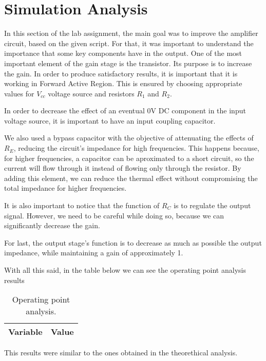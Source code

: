 \section{Simulation Analysis}
\label{sec:simulation}

In this section of the lab assignment, the main goal was to improve the amplifier circuit, based on the given script. For that, it was important to understand the importance that some key components have in the output. One of the most important element of the gain stage is the transistor. Its purpose is to increase the gain. In order to produce satisfactory results, it is important that it is working in Forward Active Region. This is ensured by choosing appropriate values for $V_{cc}$ voltage source and resistors $R_1$ and $R_2$.
\par
In order to decrease the effect of an eventual 0V DC component in the input voltage source, it is important to have an input coupling capacitor.
\par
We also used a bypass capacitor with the objective of attenuating the effects of $R_E$, reducing the circuit's impedance for high frequencies. This happens because, for higher frequencies, a capacitor can be aproximated to a short circuit, so the current will flow through it instead of flowing only through the resistor. By adding this element, we can reduce the thermal effect without compromising the total impedance for higher frequencies.
\par
It is also important to notice that the function of $R_C$ is to regulate the output signal. However, we need to be careful while doing so, because we can significantly decrease the gain.
\par
For last, the output stage's function is to decrease as much as possible the output impedance, while maintaining a gain of approximately 1.
\par
With all this said, in the table below we can see the operating point analysis results

\begin{table}[H]
  \centering
  \begin{tabular}{|l|r|}
    \hline    
    {\bf Variable} & {\bf Value} \\ \hline
    
  \end{tabular}
  \caption{Operating point analysis.}
\end{table}

This results were similar to the ones obtained in the theorethical analysis.

